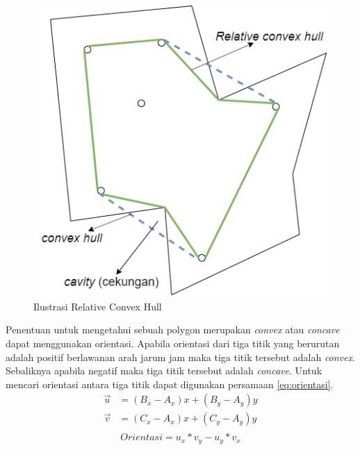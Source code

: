 \begin{figure}[!h]
	\Centering
	\includegraphics [width=0.5\columnwidth]{bab2/img/ilustrasi-relative-convex-hull}
	\caption {Ilustrasi Relative Convex Hull}
	\label {fig:ilustrasi-relative-convex-hull}
\end{figure}
\par Penentuan untuk mengetahui sebuah polygon merupakan \textit{convex} atau \textit{concave} dapat menggunakan orientasi. Apabila orientasi dari tiga titik yang berurutan adalah positif berlawanan arah jarum jam maka tiga titik tersebut adalah \textit{convex}. Sebaliknya apabila negatif maka tiga titik tersebut adalah \textit{concave}. Untuk mencari orientasi antara tiga titik dapat digunakan persamaan \ref{eq:orientasi}.
\begin{equation}
    \begin{aligned}
    \label{eq:orientasi}
        \vec{u}&=(B_x-A_x)x +(B_y-A_y)y\\
        \vec{v}&=(C_x-A_x)x +(C_y-A_y)y\\
    \end{aligned}
\end{equation}
$$ Orientasi = u_x*v_y - u_y*v_x $$
